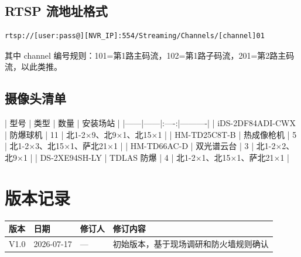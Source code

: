 \documentclass[12pt,a4paper]{ctexart}
\begin{document}
\subsection{RTSP 流地址格式}

\begin{verbatim}
rtsp://[user:pass@][NVR_IP]:554/Streaming/Channels/[channel]01
\end{verbatim}

其中 channel 编号规则：101=第1路主码流，102=第1路子码流，201=第2路主码流，以此类推。

\subsection{摄像头清单}

| 型号 | 类型 | 数量 | 安装场站 |
|------|------|:----:|----------|
| iDS-2DF84ADI-CWX | 防爆球机 | 11 | 北1-2$\times$9、北9$\times$1、北15$\times$1 |
| HM-TD25C8T-B | 热成像枪机 | 5 | 北1-2$\times$3、北15$\times$1、萨北21$\times$1 |
| HM-TD66AC-D | 双光谱云台 | 3 | 北1-2$\times$2、北9$\times$1 |
| DS-2XE94SH-LY | TDLAS 防爆 | 4 | 北1-2$\times$1、北15$\times$1、萨北21$\times$1 |

\section{版本记录}

\begin{table}[H]\centering
\begin{tabular}{p{1.5cm} p{2cm} p{2cm} p{7cm}}
\toprule
\textbf{版本} & \textbf{日期} & \textbf{修订人} & \textbf{修订内容} \\
\midrule
V1.0 & 2026-07-17 & — & 初始版本，基于现场调研和防火墙规则确认 \\
\bottomrule
\end{tabular}
\end{table}
\end{document}
